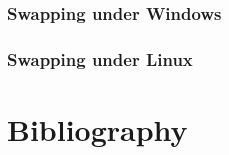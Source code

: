 
\begin{frame}
  \frametitle{Swapping under Windows}

\end{frame}


\begin{frame}
  \frametitle{Swapping under Linux}

\end{frame}

%
%

\section{Bibliography}

\begin{thebibliography}{4}


\end{thebibliography}


